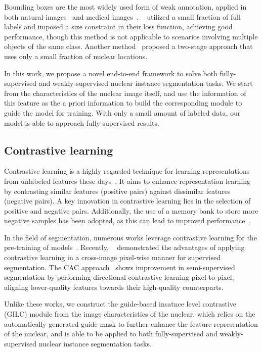 Bounding boxes are the most widely used form of weak annotation, applied in both natural images~\citep{dai2015boxsup, rajchl2016deepcut} and medical images~\citep{yang2018boxnet, zhao2018deep}. 
~\citet{kervadec2019constrained} utilized a small fraction of full labels and imposed a size constraint in their loss function, achieving good performance, though this method is not applicable to scenarios involving multiple objects of the same class. Another method~\citep{qu2020weakly} proposed a two-stage approach that uses only a small fraction of nuclear locations.

In this work, we propose a novel end-to-end framework to solve both fully-supervised and weakly-supervised nuclear instance segmentation tasks.
We start from the characteristics of the nuclear image itself, and use the information of this feature as the a priori information to build the corresponding module to guide the model for training.
With only a small amount of labeled data, our model is able to approach fully-supervised results.

\subsection{Contrastive learning}
Contrastive learning is a highly regarded technique for learning representations from unlabeled features these days~\citep{chen2020simple, chen2020improved, grill2020bootstrap}. 
It aims to enhance representation learning by contrasting similar features (positive pairs) against dissimilar features (negative pairs). A key innovation in contrastive learning lies in the selection of positive and negative pairs. Additionally, the use of a memory bank to store more negative samples has been adopted, as this can lead to improved performance~\citep{chen2020simple}.

In the field of segmentation, numerous works leverage contrastive learning for the pre-training of models~\citep{chaitanya2020contrastive, wang2021dense, xie2021propagate}. 
Recently, ~\citet{wang2021exploring} demonstrated the advantages of applying contrastive learning in a cross-image pixel-wise manner for supervised segmentation. 
The CAC approach~\citep{lai2021semi} shows improvement in semi-supervised segmentation by performing directional contrastive learning pixel-to-pixel, aligning lower-quality features towards their high-quality counterparts.

Unlike these works, we construct the guide-based insatnce level contrastive (GILC) module from the image characteristics of the nuclear, which relies on the automatically generated guide mask to further enhance the feature representation of the nuclear, and is able to be applied to both fully-supervised and weakly-supervised nuclear instance segmentation tasks.

% 